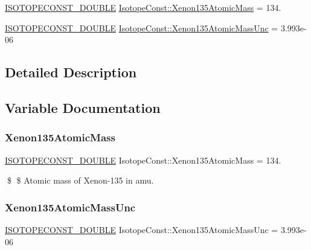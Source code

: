 \begin{DoxyCompactItemize}
\item 
\mbox{\hyperlink{group___isotope_const-_macros_ga8f45a7272ce02c0b4c65c44636ed719a}{I\+S\+O\+T\+O\+P\+E\+C\+O\+N\+S\+T\+\_\+\+D\+O\+U\+B\+LE}} \mbox{\hyperlink{group___isotope_const-_xenon-_xe135_ga6ce19f4078bf080d6a7353d196e3e839}{Isotope\+Const\+::\+Xenon135\+Atomic\+Mass}} = 134.
\item 
\mbox{\hyperlink{group___isotope_const-_macros_ga8f45a7272ce02c0b4c65c44636ed719a}{I\+S\+O\+T\+O\+P\+E\+C\+O\+N\+S\+T\+\_\+\+D\+O\+U\+B\+LE}} \mbox{\hyperlink{group___isotope_const-_xenon-_xe135_ga79ba9e84a00a1a160d6a813b6c041a88}{Isotope\+Const\+::\+Xenon135\+Atomic\+Mass\+Unc}} = 3.\+993e-\/06
\end{DoxyCompactItemize}


\subsection{Detailed Description}


\subsection{Variable Documentation}
\mbox{\label{group___isotope_const-_xenon-_xe135_ga6ce19f4078bf080d6a7353d196e3e839}} 
\subsubsection{\texorpdfstring{Xenon135\+Atomic\+Mass}{Xenon135AtomicMass}}
{\footnotesize\ttfamily \mbox{\hyperlink{group___isotope_const-_macros_ga8f45a7272ce02c0b4c65c44636ed719a}{I\+S\+O\+T\+O\+P\+E\+C\+O\+N\+S\+T\+\_\+\+D\+O\+U\+B\+LE}} Isotope\+Const\+::\+Xenon135\+Atomic\+Mass = 134.}

\$ \$ Atomic mass of Xenon-\/135 in amu. \mbox{\label{group___isotope_const-_xenon-_xe135_ga79ba9e84a00a1a160d6a813b6c041a88}} 
\subsubsection{\texorpdfstring{Xenon135\+Atomic\+Mass\+Unc}{Xenon135AtomicMassUnc}}
{\footnotesize\ttfamily \mbox{\hyperlink{group___isotope_const-_macros_ga8f45a7272ce02c0b4c65c44636ed719a}{I\+S\+O\+T\+O\+P\+E\+C\+O\+N\+S\+T\+\_\+\+D\+O\+U\+B\+LE}} Isotope\+Const\+::\+Xenon135\+Atomic\+Mass\+Unc = 3.\+993e-\/06}

